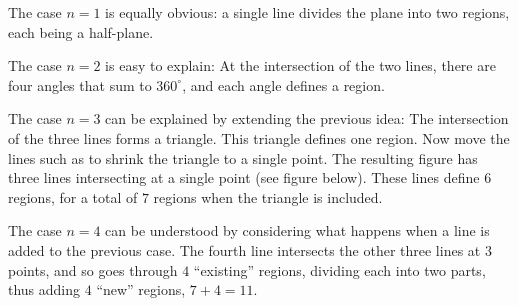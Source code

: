 \documentclass[12pt]{article}
\begin{document}
The case $n=1$ is equally obvious: a single line divides the plane into two regions, each being a half-plane. 

The case $n=2$ is easy to explain: At the intersection of the two lines, there are four angles that sum to $360^{\circ}$, and each angle defines a region. 

The case $n=3$ can be explained by extending the previous idea: The intersection of the three lines forms a triangle. This triangle defines one region. Now move the lines such as to shrink the triangle to a single point. The resulting figure has three lines intersecting at a single point (see figure below). These lines define $6$ regions, for a total of $7$ regions when the triangle is included. 
\begin{center}
\end{center}
The case $n=4$ can be understood by considering what happens when a line is added to the previous case. The fourth line intersects the other three lines at $3$ points, and so goes through $4$ ``existing'' regions, dividing each into two parts, thus adding $4$ ``new'' regions, $7+4=11$. 
\end{document}
